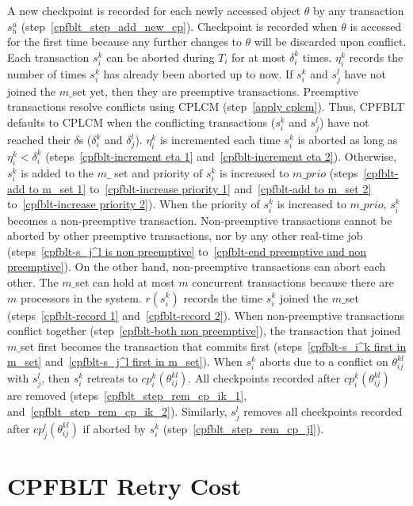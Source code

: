 \documentclass[conference]{IEEEtran}
\begin{document}
%
A new checkpoint is recorded for each newly accessed object $\theta$ by any transaction $s_h^u$ (step~\ref{cpfblt_step_add_new_cp}). Checkpoint is recorded when $\theta$ is accessed for the first time because any further changes to $\theta$ will be discarded upon conflict. Each transaction $s_{i}^{k}$ can be aborted during $T_i$ for at most $\delta_{i}^{k}$ times. $\eta_{i}^{k}$ records  the number of times $s_{i}^{k}$ has already been aborted up to now. If $s_i^k$ and $s_j^l$ have not joined the $m\_$set yet, then they are preemptive transactions. Preemptive transactions resolve conflicts using CPLCM (step~\ref{apply cplcm}). Thus, CPFBLT defaults to CPLCM when the conflicting transactions ($s_i^k$ and $s_j^l$) have not reached their $\delta$s ($\delta_i^k$ and $\delta_j^l$). $\eta_i^k$ is incremented each time $s_{i}^k$ is aborted as long as $\eta_i^k < \delta_i^k$ (steps~\ref{cpfblt-increment eta 1} and~\ref{cpfblt-increment eta 2}). Otherwise, $s_i^k$ is added to the $m\_$ set and priority of $s_{i}^k$ is increased to $m\_prio$ (steps~\ref{cpfblt-add to m_set 1} to~\ref{cpfblt-increase priority 1} and~\ref{cpfblt-add to m_set 2} to~\ref{cpfblt-increase priority 2}). When the priority of $s_i^k$ is increased to $m\_prio$, $s_i^k$ becomes a non-preemptive transaction. Non-preemptive transactions cannot be aborted by other preemptive transactions, nor by any other real-time job (steps~\ref{cpfblt-s_j^l is non preemptive} to~\ref{cpfblt-end preemptive and non preemptive}). On the other hand, non-preemptive transactions can abort each other. The $m\_$set can hold at most $m$ concurrent transactions because there are $m$ processors in the system. $r(s_i^k)$ records the time $s_i^k$ joined the $m\_$set (steps~\ref{cpfblt-record 1} and~\ref{cpfblt-record 2}). When non-preemptive transactions conflict together (step~\ref{cpfblt-both non preemptive}), the transaction that joined $m\_$set first becomes the transaction that commits first (steps~\ref{cpfblt-s_i^k first in m_set} and~\ref{cpfblt-s_j^l first in m_set}). When $s_i^k$ aborts due to a conflict on $\theta_{ij}^{kl}$ with $s_j^l$, then $s_i^k$ retreats to $cp_i^k(\theta_{ij}^{kl})$. All checkpoints recorded after $cp_i^k(\theta_{ij}^{kl})$ are removed (steps~\ref{cpfblt_step_rem_cp_ik_1}, and~\ref{cpfblt_step_rem_cp_ik_2}). Similarly, $s_j^l$ removes all checkpoints recorded after $cp_j^l(\theta_{ij}^{kl})$ if aborted by $s_i^k$ (step~\ref{cpfblt_step_rem_cp_jl}).

\section{CPFBLT Retry Cost}\label{sec:cpfblt rc}
\end{document}

